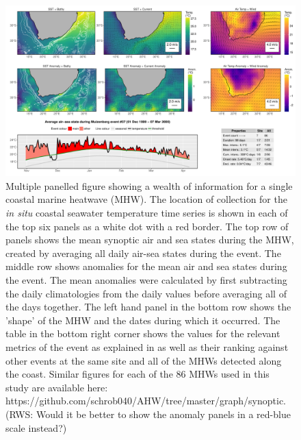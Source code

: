 \documentclass[a4paper,10pt,review]{elsarticle}
\begin{document}
\begin{figure}
\includegraphics[width=1.0\textwidth]{figure_2.pdf}
\caption{Multiple panelled figure showing a wealth of information for a single coastal marine heatwave (MHW). The location of collection for the \emph{in situ} coastal seawater temperature time series is shown in each of the top six panels as a white dot with a red border. The top row of panels shows the mean synoptic air and sea states during the MHW, created by averaging all daily air-sea states during the event. The middle row shows anomalies for the mean air and sea states during the event. The mean anomalies were calculated by first subtracting the daily climatologies from the daily values before averaging all of the days together. The left hand panel in the bottom row shows the 'shape' of the MHW and the dates during which it occurred. The table in the bottom right corner shows the values for the relevant metrics of the event as explained in  as well as their ranking against other events at the same site and all of the MHWs detected along the coast. Similar figures for each of the 86 MHWs used in this study are available here: https://github.com/schrob040/AHW/tree/master/graph/synoptic. (RWS: Would it be better to show the anomaly panels in a red-blue scale instead?)}
\label{figure2}
\end{figure}
\end{document}
